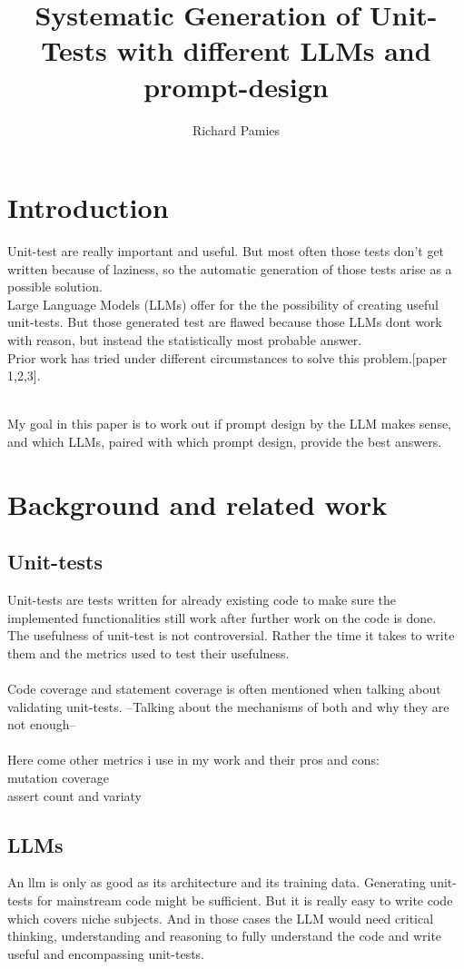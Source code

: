 \documentclass[a4paper,11pt,oneside]{memoir}
\title{Systematic Generation of Unit-Tests with different LLMs and prompt-design}
\author{Richard Pamies}
\begin{document}
\frontmatter

\smarttitle

\newpage
\tableofcontents

\mainmatter

\chapter{Introduction}
Unit-test are really important and useful. But most often those tests don't get written because of laziness, so the automatic generation of those tests arise as a possible solution.
\\
Large Language Models (LLMs) offer for the the possibility of creating useful unit-tests. But those generated test are flawed because those LLMs dont work with reason, but instead the statistically most probable answer.
\\
Prior work  has tried under different circumstances to solve this problem.[paper 1,2,3].

\\
My goal in this paper is to work out if prompt design by the LLM makes sense, and which LLMs, paired with which prompt design, provide the best answers.

\chapter{Background and related work}
\section{Unit-tests}
Unit-tests are tests written for already existing code to make sure the implemented functionalities still work after further work on the code is done.\\The usefulness of unit-test is not controversial. Rather the time it takes to write them and the metrics used to test their usefulness. \\\\
Code coverage and statement coverage is often mentioned when talking about validating unit-tests. --Talking about the mechanisms of both and why they are not enough--\\\\
Here come other metrics i use in my work and their pros and cons:\\
mutation coverage\\
assert count and variaty\\
\section{LLMs}
An llm is only as good as its architecture and its training data. Generating unit-tests for mainstream code might be sufficient. But it is really easy to write code which covers niche subjects. And in those cases the LLM would need critical thinking, understanding and reasoning to fully understand the code and write useful and encompassing unit-tests.
\end{document}
